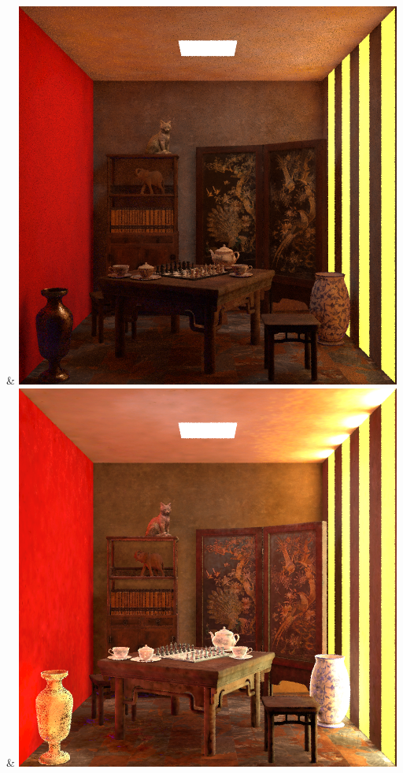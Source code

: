 & \includegraphics[width=\linewidth]{figures/py/tests/quality_comparison/nrc+bt_1spp_chess.png}
& \includegraphics[width=\linewidth]{figures/py/tests/quality_comparison/nrc+lt_1spp_chess.png}
